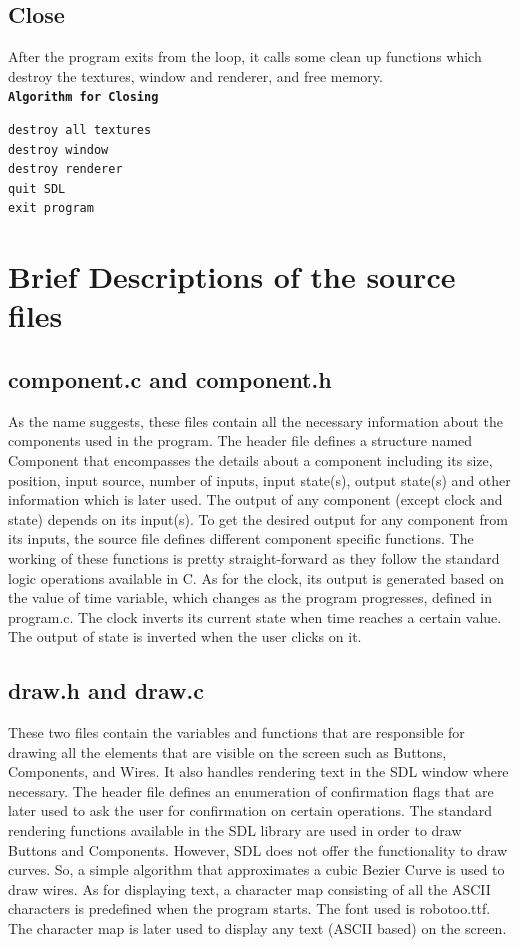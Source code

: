 \documentclass[report]{subfiles}
\begin{document}
    \subsection{Close}
    After the program exits from the loop, it calls some clean up functions which destroy the textures, window and renderer, and free memory.\\
        \textbf{\texttt{Algorithm for Closing}}
        \begin{verbatim}
destroy all textures
destroy window
destroy renderer
quit SDL
exit program
        \end{verbatim}
    \section{Brief Descriptions of the source files}
        \subsection{component.c and component.h}
    As the name suggests, these files contain all the necessary
    information about the components used in the program. The header
    file defines a structure named Component that encompasses the
    details about a component including its size, position, input source,
    number of inputs, input state(s), output state(s) and other
    information which is later used.
    The output of any component (except clock and state) depends on
    its input(s). To get the desired output for any component from its
    inputs, the source file defines different component specific
    functions. The working of these functions is pretty straight-forward
    as they follow the standard logic operations available in C. As for
    the clock, its output is generated based on the value of time
    variable, which changes as the program progresses, defined in
    program.c. The clock inverts its current state when time reaches a
    certain value. The output of state is inverted when the user clicks
    on it.
\subsection{draw.h and draw.c}
    These two files contain the variables and functions that are
    responsible for drawing all the elements that are visible on the
    screen such as Buttons, Components, and Wires. It also handles
    rendering text in the SDL window where necessary. The header
    file defines an enumeration of confirmation flags that are later used
    to ask the user for confirmation on certain operations.
    The standard rendering functions available in the SDL library are
    used in order to draw Buttons and Components. However, SDL
    does not offer the functionality to draw curves. So, a simple
    algorithm that approximates a cubic Bezier Curve is used to draw
    wires.
    As for displaying text, a character map consisting of all the ASCII
    characters is predefined when the program starts. The font used is
    robotoo.ttf. The character map is later used to display any text
    (ASCII based) on the screen.
\end{document}
